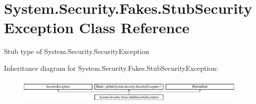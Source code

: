 \hypertarget{class_system_1_1_security_1_1_fakes_1_1_stub_security_exception}{\section{System.\-Security.\-Fakes.\-Stub\-Security\-Exception Class Reference}
\label{class_system_1_1_security_1_1_fakes_1_1_stub_security_exception}
}


Stub type of System.\-Security.\-Security\-Exception 


Inheritance diagram for System.\-Security.\-Fakes.\-Stub\-Security\-Exception\-:\begin{figure}[H]
\begin{center}
\leavevmode
\includegraphics[height=1.216069cm]{class_system_1_1_security_1_1_fakes_1_1_stub_security_exception}
\end{center}
\end{figure}
